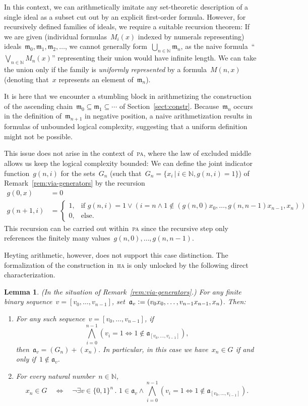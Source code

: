 \documentclass[oneside,reqno]{amsart}
\theoremstyle{definition}
\theoremstyle{plain}
\newtheorem{lemma}[defn]{Lemma}
\theoremstyle{remark}
\newcommand{\aaa}{\mathfrak{a}}
\newcommand{\mmm}{\mathfrak{m}}
\newcommand{\NN}{\mathbb{N}}
\newcommand{\defeq}{\vcentcolon=}
\renewcommand{\_}{\mathpunct{.}\,}
\begin{document}
In this context, we can arithmetically imitate any set-theoretic description of
a single ideal as a subset cut out by an explicit first-order formula. However, for
recursively defined families of ideals, we require a suitable recursion
theorem: If we are given (individual formulas~$M_i(x)$ indexed by numerals
representing) ideals~$\mmm_0,\mmm_1,\mmm_2,\ldots$, we cannot generally
form~$\bigcup_{n\in\NN} \mmm_n$, as the naive formula~``$\bigvee_{n\in\NN} M_n(x)$''
representing their union would have infinite length. We can take the union only
if the family is \emph{uniformly represented} by a formula~$M(n,x)$ (denoting
that~$x$ represents an element of~$\mmm_n$).

It is here that we encounter a stumbling block in arithmetizing the
construction of the ascending chain~$\mmm_0 \subseteq \mmm_1 \subseteq \cdots$
of Section~\ref{sect:constr}. Because~$\mmm_n$ occurs in the
definition of~$\mmm_{n+1}$ in negative position, a naive arithmetization
results in formulas of unbounded logical complexity, suggesting that
a uniform definition might not be possible.

This issue does not arise in the context of~\textsc{pa}, where the law of
excluded middle allows us keep the logical complexity bounded: We can define
the joint indicator function~$g(n,i)$ for the sets~$G_n$ (such that~$G_n = \{
x_i \,|\, i \in \NN, g(n,i) = 1 \}$) of Remark~\ref{rem:via-generators} by the recursion
\begin{align*}
  g(0,x) &= 0 \\
  g(n+1,i) &= \begin{cases}
    1, & \text{if $g(n,i) = 1 \vee (i = n \wedge 1 \not\in
    (g(n,0)x_0,\ldots,g(n,n-1)x_{n-1},x_n))$} \\
    0, & \text{else.}
  \end{cases}
\end{align*}
This recursion can be carried out within~\textsc{pa} since the recursive step
only references the finitely many values~$g(n,0),\ldots,g(n,n-1)$.

Heyting arithmetic, however, does not support this case distinction. The
formalization of the construction in~\textsc{ha} is only unlocked by the following
direct characterization.

\begin{lemma}\label{lemma:uniform-char}(In the situation of Remark~\ref{rem:via-generators}.)
For any finite binary sequence~$v = [v_0,\ldots,v_{n-1}]$, set~$\aaa_v
\defeq (v_0x_0,\ldots,v_{n-1}x_{n-1},x_n)$. Then:
\begin{enumerate}
\item For any such sequence~$v = [v_0,\ldots,v_{n-1}]$, if
\[ \bigwedge_{i=0}^{n-1} (v_i = 1 \Leftrightarrow 1 \not\in \aaa_{[v_0,\ldots,v_{i-1}]}), \]
then~$\aaa_v = (G_n) + (x_n)$.
In particular, in this case we have~$x_n \in G$ if and only if~$1 \not\in \aaa_v$.
\item For every natural number~$n \in \NN$,
\[ x_n \in G \quad\Longleftrightarrow\quad \neg
  \exists v \in \{0,1\}^n\_
    1 \in \aaa_v \wedge
      \bigwedge_{i=0}^{n-1} (v_i = 1 \Leftrightarrow 1 \not\in \aaa_{[v_0,\ldots,v_{i-1}]}). \]
\end{enumerate}
\end{lemma}
\end{document}

